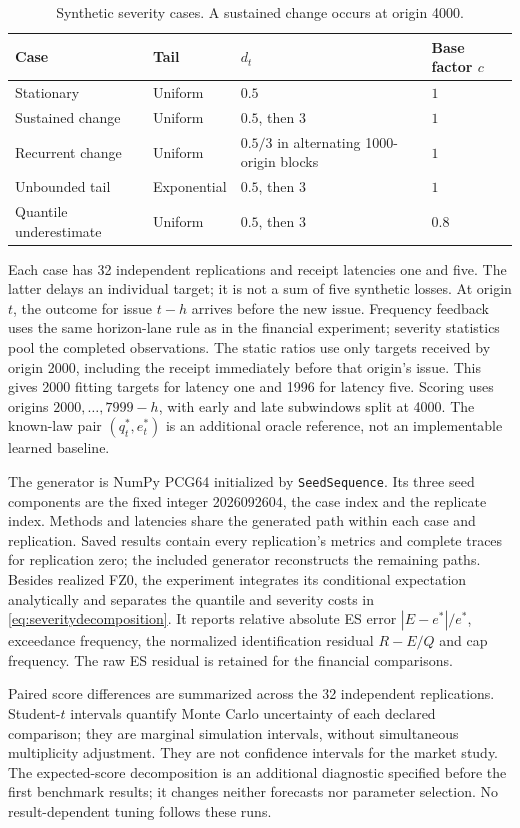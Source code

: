 \documentclass[11pt,a4paper]{article}
\theoremstyle{definition}\newtheorem{definition}[theorem]{Definition}
\begin{document}
\begin{table}[htbp]\centering\small
\caption{Synthetic severity cases. A sustained change occurs at origin 4000.}
\begin{tabular}{llll}\toprule
Case & Tail & $d_t$ & Base factor $c$\\\midrule
Stationary & Uniform & $0.5$ & $1$\\
Sustained change & Uniform & $0.5$, then $3$ & $1$\\
Recurrent change & Uniform & $0.5/3$ in alternating 1000-origin blocks & $1$\\
Unbounded tail & Exponential & $0.5$, then $3$ & $1$\\
Quantile underestimate & Uniform & $0.5$, then $3$ & $0.8$\\\bottomrule
\end{tabular}\label{tab:severitydgps}
\end{table}

Each case has 32 independent replications and receipt latencies one and five. The latter delays an individual target; it is not a sum of five synthetic losses. At origin $t$, the outcome for issue $t-h$ arrives before the new issue. Frequency feedback uses the same horizon-lane rule as in the financial experiment; severity statistics pool the completed observations. The static ratios use only targets received by origin 2000, including the receipt immediately before that origin's issue. This gives 2000 fitting targets for latency one and 1996 for latency five. Scoring uses origins $2000,\ldots,7999-h$, with early and late subwindows split at 4000. The known-law pair $(q_t^*,e_t^*)$ is an additional oracle reference, not an implementable learned baseline.

The generator is NumPy PCG64 initialized by \texttt{SeedSequence}. Its three seed components are the fixed integer 2026092604, the case index and the replicate index. Methods and latencies share the generated path within each case and replication. Saved results contain every replication's metrics and complete traces for replication zero; the included generator reconstructs the remaining paths. Besides realized FZ0, the experiment integrates its conditional expectation analytically and separates the quantile and severity costs in \eqref{eq:severitydecomposition}. It reports relative absolute ES error $|E-e^*|/e^*$, exceedance frequency, the normalized identification residual $R-E/Q$ and cap frequency. The raw ES residual is retained for the financial comparisons.

Paired score differences are summarized across the 32 independent replications. Student-$t$ intervals quantify Monte Carlo uncertainty of each declared comparison; they are marginal simulation intervals, without simultaneous multiplicity adjustment. They are not confidence intervals for the market study. The expected-score decomposition is an additional diagnostic specified before the first benchmark results; it changes neither forecasts nor parameter selection. No result-dependent tuning follows these runs.
\end{document}
